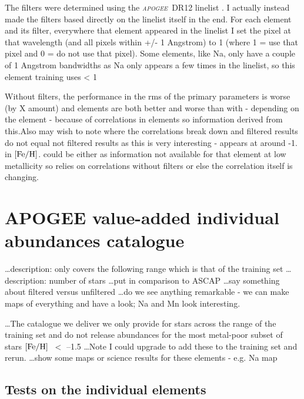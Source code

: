 \documentclass[12pt, preprint]{aastex}
\newcommand{\project}[1]{\textsl{#1}}
\newcommand{\apogee}{\project{\textsc{apogee}}}
\newcommand{\feh}{\mbox{$\rm [Fe/H]$}}
\begin{document}

The filters were determined using the \apogee\ DR12 linelist \citep{Shetrone2015}. 
I actually instead made the filters based directly on the linelist itself in the end. For each element and its filter, everywhere that element appeared in the linelist I set the pixel at that wavelength (and all pixels within +/- 1 Angstrom) to 1 (where 1 = use that pixel and 0 = do not use that pixel). Some elements, like Na, only have a couple of 1 Angstrom bandwidths as Na only appears a few times in the linelist, so this element training uses < 1 %

Without filters, the performance in the rms of the primary parameters is worse (by X amount) and elements are both better and worse than with - depending on the element - because of correlations in elements so information derived from this.Also may wish to note where the correlations break down and filtered results do not equal not filtered results as this is very interesting - appears at around -1. in \feh. could be either as information not available for that element at low metallicity so relies on correlations without filters or else the correlation itself is changing.   


\section{APOGEE value-added individual abundances catalogue}

\ldots description: only covers the following range which is that of the training set 
\ldots description: number of stars
\ldots put in comparison to ASCAP
\ldots say something about filtered versus unfiltered
\ldots do we see anything remarkable - we can make maps of everything and have a look; Na and Mn look interesting. 

\ldots The catalogue we deliver we only provide for stars across the range of the training set and do not release abundances for the most metal-poor subset of stars \feh\ $<$ --1.5
\ldots Note I could upgrade to add these to the training set and rerun.
\ldots show some maps or science results for these elements  - e.g. Na map 

\subsection{Tests on the individual elements}
\end{document}

